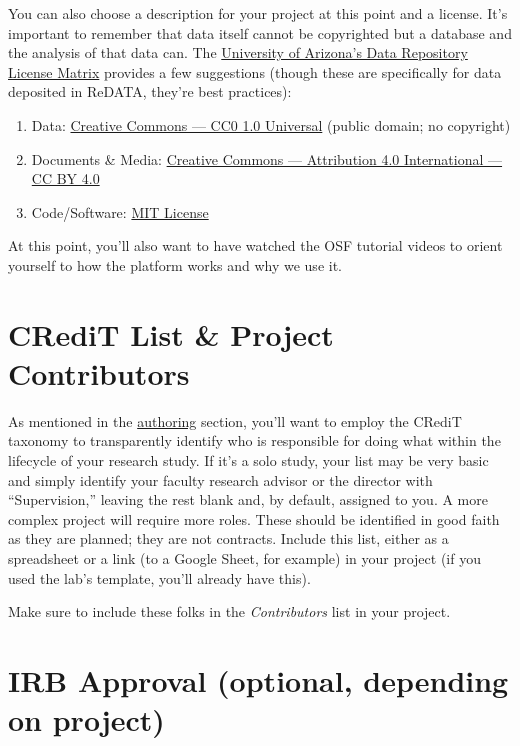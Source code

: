 \documentclass[
]{book}
\providecommand{\tightlist}{%
  \setlength{\itemsep}{0pt}\setlength{\parskip}{0pt}}
\begin{document}
You can also choose a description for your project at this point and a license. It's important to remember that data itself cannot be copyrighted but a database and the analysis of that data can. The \href{https://osf.io/f57nz/}{University of Arizona's Data Repository License Matrix} provides a few suggestions (though these are specifically for data deposited in ReDATA, they're best practices):

\begin{enumerate}
\def\labelenumi{\arabic{enumi}.}
\tightlist
\item
  Data: \href{https://creativecommons.org/publicdomain/zero/1.0/}{Creative Commons --- CC0 1.0 Universal} (public domain; no copyright)
\item
  Documents \& Media: \href{https://creativecommons.org/licenses/by/4.0/}{Creative Commons --- Attribution 4.0 International --- CC BY 4.0}
\item
  Code/Software: \href{https://choosealicense.com/licenses/mit/}{MIT License}
\end{enumerate}

At this point, you'll also want to have watched the OSF tutorial videos to orient yourself to how the platform works and why we use it.

\hypertarget{credit-list-project-contributors}{%
\section{CRediT List \& Project Contributors}\label{credit-list-project-contributors}}

As mentioned in the \protect\hyperlink{authorship}{authoring} section, you'll want to employ the CRediT taxonomy to transparently identify who is responsible for doing what within the lifecycle of your research study. If it's a solo study, your list may be very basic and simply identify your faculty research advisor or the director with ``Supervision,'' leaving the rest blank and, by default, assigned to you. A more complex project will require more roles. These should be identified in good faith as they are planned; they are not contracts. Include this list, either as a spreadsheet or a link (to a Google Sheet, for example) in your project (if you used the lab's template, you'll already have this).

Make sure to include these folks in the \emph{Contributors} list in your project.

\hypertarget{irb-approval-optional-depending-on-project}{%
\section{IRB Approval (optional, depending on project)}\label{irb-approval-optional-depending-on-project}}
\end{document}
